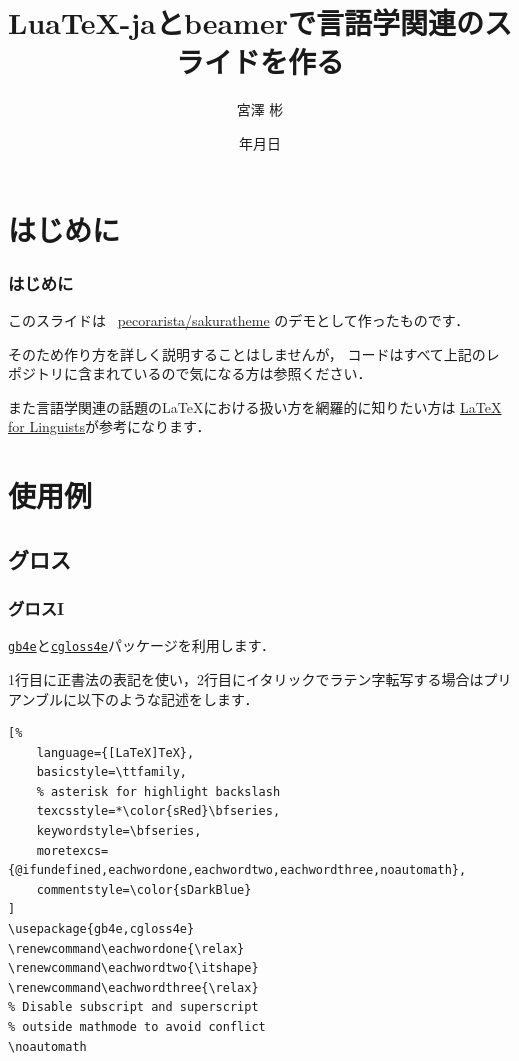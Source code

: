 \documentclass[
    12pt,
    unicode]{beamer}
\title{Lua\TeX{}-jaとbeamerで言語学関連のスライドを作る}
\institute{総合研究大学院大学}
\author{宮澤 彬}
\date{{\number\year}年{\number\month}月{\number\day}日}
\renewcommand\eachwordone{\relax}
\renewcommand\eachwordtwo{\itshape}
\renewcommand\eachwordthree{\relax}
\begin{document}
\begin{frame}
    \maketitle
\end{frame}

\section{はじめに}
\begin{frame}
    \frametitle{はじめに}
    このスライドは \faGithub\ \href{https://github.com/pecorarista/sakuratheme}{\ttfamily pecorarista/sakuratheme}
    のデモとして作ったものです．

    \bigskip

    そのため作り方を詳しく説明することはしませんが，
    コードはすべて上記のレポジトリに含まれているので気になる方は参照ください．
    \bigskip

    また言語学関連の話題の\LaTeX における扱い方を網羅的に知りたい方は
    \href{https://www1.essex.ac.uk/linguistics/external/clmt/latex4ling/}
    {LaTeX for Linguists}が参考になります．
\end{frame}

\section{使用例}
\subsection{グロス}
\begin{frame}[fragile]
\frametitle{グロスI}
\href{https://ctan.org/pkg/gb4e}{\texttt{gb4e}}と\href{https://ctan.org/pkg/gb4e}{\texttt{cgloss4e}}パッケージを利用します．

\bigskip

1行目に正書法の表記を使い，2行目にイタリックでラテン字転写する場合はプリアンブルに以下のような記述をします．
\begin{leftbar}
\begin{lstlisting}[%
    language={[LaTeX]TeX},
    basicstyle=\ttfamily,
    % asterisk for highlight backslash
    texcsstyle=*\color{sRed}\bfseries,
    keywordstyle=\bfseries,
    moretexcs={@ifundefined,eachwordone,eachwordtwo,eachwordthree,noautomath},
    commentstyle=\color{sDarkBlue}
]
\usepackage{gb4e,cgloss4e}
\renewcommand\eachwordone{\relax}
\renewcommand\eachwordtwo{\itshape}
\renewcommand\eachwordthree{\relax}
% Disable subscript and superscript
% outside mathmode to avoid conflict
\noautomath
\end{lstlisting}
\end{leftbar}
\end{frame}
\end{document}
